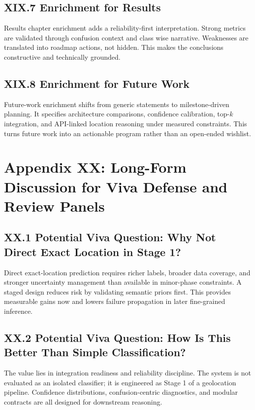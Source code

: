 \subsection*{XIX.7 Enrichment for Results}
Results chapter enrichment adds a reliability-first interpretation. Strong metrics are validated through confusion context and class wise narrative. Weaknesses are translated into roadmap actions, not hidden. This makes the conclusions constructive and technically grounded.

\subsection*{XIX.8 Enrichment for Future Work}
Future-work enrichment shifts from generic statements to milestone-driven planning. It specifies architecture comparisons, confidence calibration, top-$k$ integration, and API-linked location reasoning under measured constraints. This turns future work into an actionable program rather than an open-ended wishlist.

\section*{Appendix XX: Long-Form Discussion for Viva Defense and Review Panels}

\subsection*{XX.1 Potential Viva Question: Why Not Direct Exact Location in Stage 1?}
Direct exact-location prediction requires richer labels, broader data coverage, and stronger uncertainty management than available in minor-phase constraints. A staged design reduces risk by validating semantic priors first. This provides measurable gains now and lowers failure propagation in later fine-grained inference.

\subsection*{XX.2 Potential Viva Question: How Is This Better Than Simple Classification?}
The value lies in integration readiness and reliability discipline. The system is not evaluated as an isolated classifier; it is engineered as Stage 1 of a geolocation pipeline. Confidence distributions, confusion-centric diagnostics, and modular contracts are all designed for downstream reasoning.

